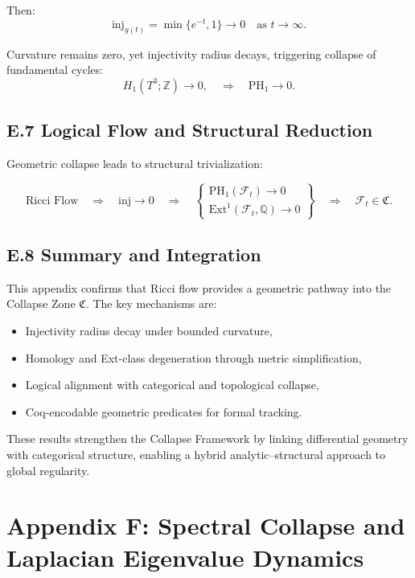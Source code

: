 \documentclass[11pt]{article}
\begin{document}
Then:
\[
\mathrm{inj}_{g(t)} = \min \{ e^{-t}, 1 \} \to 0 \quad \text{as } t \to \infty.
\]

Curvature remains zero, yet injectivity radius decays, triggering collapse of fundamental cycles:
\[
H_1(T^3; \mathbb{Z}) \to 0, \quad \Rightarrow \quad \mathrm{PH}_1 \to 0.
\]

\subsection{E.7 Logical Flow and Structural Reduction}

Geometric collapse leads to structural trivialization:

\[
\text{Ricci Flow} \quad \Rightarrow \quad \mathrm{inj} \to 0 \quad \Rightarrow \quad
\left\{
\begin{array}{l}
\mathrm{PH}_1(\mathcal{F}_t) \to 0 \\
\mathrm{Ext}^1(\mathcal{F}_t, \mathbb{Q}) \to 0
\end{array}
\right\} \quad \Rightarrow \quad \mathcal{F}_t \in \mathfrak{C}.
\]

\subsection{E.8 Summary and Integration}

This appendix confirms that Ricci flow provides a geometric pathway into the Collapse Zone \( \mathfrak{C} \). The key mechanisms are:

\begin{itemize}
  \item Injectivity radius decay under bounded curvature,
  \item Homology and Ext-class degeneration through metric simplification,
  \item Logical alignment with categorical and topological collapse,
  \item Coq-encodable geometric predicates for formal tracking.
\end{itemize}

These results strengthen the Collapse Framework by linking differential geometry with categorical structure, enabling a hybrid analytic–structural approach to global regularity.




\appendix
\section*{Appendix F: \texorpdfstring{Spectral Collapse and Laplacian Eigenvalue Dynamics}{Spectral Collapse and Laplacian Eigenvalue Dynamics}}
\end{document}
